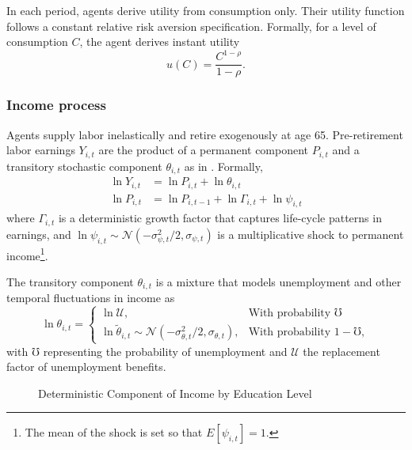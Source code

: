 \documentclass[./RiskyContrib.tex]{subfiles}
\begin{document}
In each period, agents derive utility from consumption only. 
Their utility function follows a constant relative risk aversion 
specification. Formally, for a level of 
consumption $C$, the agent derives instant utility
\begin{equation}
	u(C) = \frac{C^{1-\rho}}{1- \rho}.
\end{equation}

\subsubsection{Income process}

Agents supply labor inelastically and retire exogenously at age 
65. Pre-retirement labor earnings $Y_{i,t}$ are the product of a permanent
component $P_{i,t}$ and a transitory stochastic component $\theta_{i,t}$ as
in \cite{Carroll1997qje}. Formally,
\begin{equation*}
\begin{split}
\ln Y_{i,t} &= \ln P_{i,t} + \ln \theta_{i,t} \\
\ln P_{i,t} &= \ln P_{i,t-1} + \ln \Gamma_{i,t} + \ln \psi_{i,t}
\end{split}
\end{equation*}
where $\Gamma_{i,t}$ is a deterministic growth factor that captures
life-cycle patterns in earnings, and
$\ln \psi_{i,t}\sim \mathcal{N}(-\sigma^2_{\psi,t}/2, \sigma_{\psi,t})$
is a multiplicative shock to permanent income\footnote{The mean of the shock is set so that $E[\psi_{i,t}] = 1$.}.

The transitory component $\theta_{i,t}$ is a mixture that models unemployment and
other temporal fluctuations in income as
\begin{equation*}
\ln\theta_{i,t} = \begin{cases}
\ln \mathcal{U}, & \text{With probability } \mho\\
\ln \tilde{\theta}_{i,t}\sim\mathcal{N}(-\sigma^2_{\theta,t}/2, \sigma_{\theta,t}), & \text{With probability } 1-\mho,
\end{cases}
\end{equation*}
with $\mho$ representing the probability of unemployment and $\mathcal{U}$ the replacement
factor of unemployment benefits.

\begin{figure}
\begin{center}
\caption{Deterministic Component of Income by Education Level}\label{fig:income_paths}
\end{center}
\end{figure}
\end{document}
